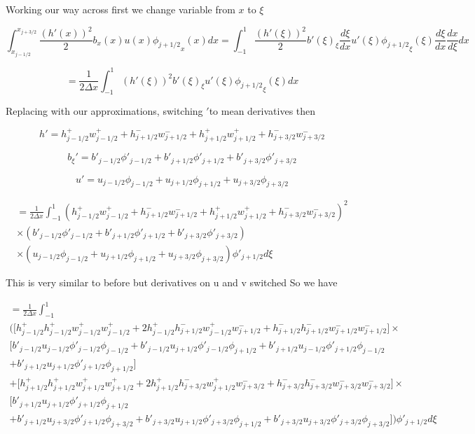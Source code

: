\documentclass[12pt]{article}
\begin{document}
Working our way across 
first we change variable from $x$ to $\xi$

\[\int_{x_{j-1/2}}^{x_{j+3/2}} \frac{(h'(x))^2}{2}b_x(x) u(x) {\phi_{j+1/2}}_x(x)dx = \int_{-1}^{1} \frac{(h'(\xi))^2}{2}b'(\xi)_{\xi}\frac{d\xi}{dx}  u'(\xi) {\phi_{j+1/2}}_{\xi}(\xi)\frac{d\xi}{dx}  \frac{dx}{d\xi} dx\]

\[ =\frac{1}{2 \Delta x} \int_{-1}^{1} (h'(\xi))^2b'(\xi)_{\xi} u'(\xi) {\phi_{j+1/2}}_{\xi}(\xi)dx\]

Replacing with our approximations, switching $'$to mean derivatives then

\[h' = h^+_{j-1/2} w^+_{j-1/2} + h^-_{j+1/2} w^-_{j+1/2} + h^+_{j+1/2} w^+_{j+1/2} + h^-_{j+3/2} w^-_{j+3/2}   \]

\[b_{\xi}' = b'_{j-1/2} \phi'_{j-1/2} +  b'_{j+1/2} \phi'_{j+1/2} +  b'_{j+3/2} \phi'_{j+3/2}   \]

\[u' = u_{j-1/2} \phi_{j-1/2} +  u_{j+1/2} \phi_{j+1/2} + u_{j+3/2} \phi_{j+3/2}   \]

\begin{multline*}
=\frac{1}{2 \Delta x} \int_{-1}^{1} \left(h^+_{j-1/2} w^+_{j-1/2} + h^-_{j+1/2} w^-_{j+1/2} + h^+_{j+1/2} w^+_{j+1/2} + h^-_{j+3/2} w^-_{j+3/2}\right)^2\\ \times \left(b'_{j-1/2} \phi'_{j-1/2} +  b'_{j+1/2} \phi'_{j+1/2} +  b'_{j+3/2} \phi'_{j+3/2}\right)\\ \times\left(u_{j-1/2} \phi_{j-1/2} +  u_{j+1/2} \phi_{j+1/2} + u_{j+3/2} \phi_{j+3/2} \right) \phi'_{j+1/2} d\xi
\end{multline*}

This is very similar to before but derivatives on u and v switched So we have

\begin{multline}
= \frac{1}{2\Delta x}\int_{-1}^{1} \\
\bigg(\bigg[ h^+_{j-1/2}h^+_{j-1/2} w^+_{j-1/2}w^+_{j-1/2}  + 2h^+_{j-1/2}h^-_{j+1/2} w^+_{j-1/2} w^-_{j+1/2} + h^-_{j+1/2}h^-_{j+1/2} w^-_{j+1/2}w^-_{j+1/2}\bigg] \times \\\big[b'_{j-1/2}u_{j-1/2} \phi'_{j-1/2} \phi_{j-1/2} + b'_{j-1/2}u_{j+1/2} \phi'_{j-1/2} \phi_{j+1/2}  + b'_{j+1/2} u_{j-1/2}\phi'_{j+1/2} \phi_{j-1/2} \\+ b'_{j+1/2}u_{j+1/2} \phi'_{j+1/2} \phi_{j+1/2}  \big]  \\ +  \bigg[h^+_{j+1/2}h^+_{j+1/2} w^+_{j+1/2}w^+_{j+1/2}+ 2h^+_{j+1/2}h^-_{j+3/2} w^+_{j+1/2} w^-_{j+3/2} + h^-_{j+3/2}h^-_{j+3/2} w^-_{j+3/2}w^-_{j+3/2}\bigg] \times\\\big[ b'_{j+1/2}u_{j+1/2} \phi'_{j+1/2} \phi_{j+1/2} \\ +   b'_{j+1/2}u_{j+3/2} \phi'_{j+1/2} \phi_{j+3/2} +   b'_{j+3/2} u_{j+1/2} \phi'_{j+3/2} \phi_{j+1/2} +  b'_{j+3/2}u_{j+3/2} \phi'_{j+3/2}  \phi_{j+3/2}  \big]  \bigg) \phi'_{j+1/2} d\xi
\end{multline}
\end{document}
